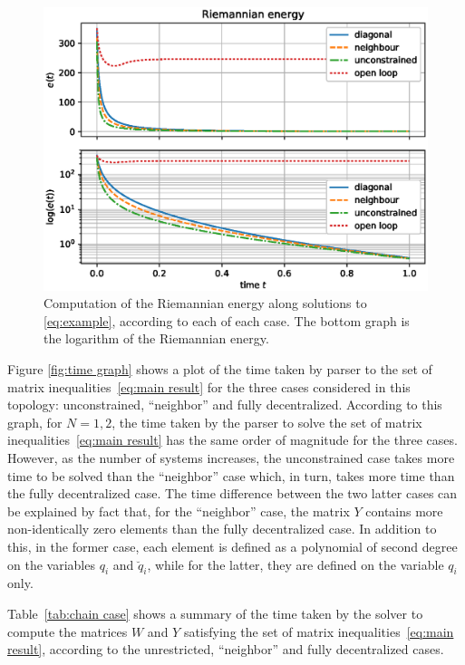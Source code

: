 \documentclass[10pt,twocolumn,twoside]{IEEEtran}
\newcounter{para}
\newcommand\mypara{\par}
\theoremstyle{plain}
\theoremstyle{definition}
\theoremstyle{remark}
\begin{document}
\begin{figure}[htbp!]
	\centering
	\includegraphics[width=\linewidth]{./imgs/Riemannian_energy.eps}
	\caption{Computation of the Riemannian energy along solutions to \eqref{eq:example}, according to each of each case. The bottom graph is the logarithm of the Riemannian energy.}
	\label{fig:Riemannian energy}
\end{figure}

\mypara Figure \ref{fig:time graph} shows a plot of the time taken by parser to the set of matrix inequalities~\eqref{eq:main result} for the three cases considered in this topology: unconstrained, ``neighbor'' and fully decentralized.  According to this graph, for $N=1,2$, the time taken by the parser to solve the set of matrix inequalities~\eqref{eq:main result} has the same order of magnitude for the three cases. However, as the number of systems increases, the unconstrained case takes more time to be solved than the ``neighbor'' case which, in turn, takes more time than the fully decentralized case. The time difference between the two latter cases can be explained by fact that, for the ``neighbor'' case, the matrix $Y$ contains more non-identically zero elements than the fully decentralized case. In addition to this, in the former case, each element is defined as a polynomial of second degree on the variables $q_i$ and $\breve{q}_i$, while for the latter, they are defined on the variable $q_i$ only.

\mypara Table~\ref{tab:chain case} shows a summary of the time taken by the solver to compute the matrices $W$ and $Y$ satisfying the set of matrix inequalities~\eqref{eq:main result}, according to the unrestricted, ``neighbor'' and fully decentralized cases.
\end{document}
